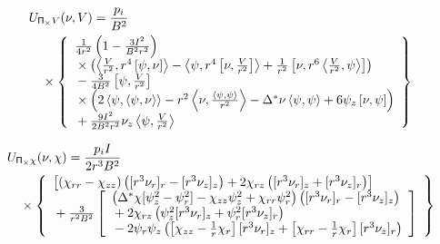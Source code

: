 \documentclass[letterpaper]{book}
\newcommand{\tensor}[1]{\mathsf{#1}}
\renewcommand{\P}{\tensor{\Pi}}
\newcommand{\gs}[1]{\Delta^* #1}
\newcommand{\pb}[2]{\left[#1,#2\right]}
\newcommand{\ip}[2]{\left\langle  #1,#2\right\rangle}
\begin{document}
\begin{eqnarray*}
  & \lefteqn{U_{\P_\times V}(\nu, V) = \frac{p_i}{B^2}} &
  \\ && \mbox{} \times
  \left\{ \begin{array}{l}
      \frac{1}{4 r^2} \left(1 - \frac{3 I^2}{B^2 r^2} \right) 
      \\ \mbox{} \times
      \left( \ip{\frac{V}{r^2}}{r^4 \pb{\psi}{\nu}}
            -\ip{\psi}{r^4\pb{\nu}{\frac{V}{r^2}}}
	    +\frac{1}{r^2}\pb{\nu}{r^6\ip{\frac{V}{r^2}}{\psi}} \right)
      \\ \mbox{}
      -\frac{3}{4 B^2} \pb{\psi}{\frac{V}{r^2}}
      \\ \mbox{} \times
      \left( 2 \ip{\psi}{\ip{\psi}{\nu}}
           - r^2 \ip{\nu}{\frac{\ip{\psi}{\psi}}{r^2}}
	   - \gs{\nu} \ip{\psi}{\psi}
	   + 6 \psi_z \pb{\nu}{\psi} \right)
      \\ \mbox{}
      +\frac{9 I^2}{2 B^2 r^2} \nu_z \ip{\psi}{\frac{V}{r^2}}
    \end{array} \right\}
\end{eqnarray*}

\begin{eqnarray*}
  & \lefteqn{U_{\P_\times \chi}(\nu, \chi) = \frac{p_i I}{2 r^3 B^2}} &
  \\ && \mbox{} \times 
  \left\{ \begin{array}{l}
    \left[ \left( \chi_{r r} - \chi_{z z} \right)
           \left( [r^3 \nu_r]_r - [r^3 \nu_z]_z \right)
       +   2 \chi_{r z} 
           \left( [r^3 \nu_r]_z + [r^3 \nu_z]_r \right)
           \right]
    \\ \mbox{}
    + \frac{3}{r^2 B^2} \left[ \begin{array}{l} 
	\left( \gs{\chi}[\psi_z^2 - \psi_r^2] 
        - \chi_{z z} \psi_z^2 + \chi_{r r} \psi_r^2 \right)
	\left( [r^3 \nu_r]_r - [r^3 \nu_z]_z \right)
	\\ \mbox{} + 2 \chi_{r z} 
	\left( \psi_z^2 [r^3 \nu_r]_z
	      +\psi_r^2 [r^3 \nu_z]_r \right)
	\\ \mbox{} - 2 \psi_r \psi_z 
	\left( \left[\chi_{z z} - \frac{1}{r}\chi_r \right] [r^3 \nu_r]_z
	      +\left[\chi_{r r} - \frac{1}{r}\chi_r \right][r^3 \nu_z]_r 
	      \right)
      \end{array} \right]
  \end{array} \right\}
\end{eqnarray*}
\end{document}

